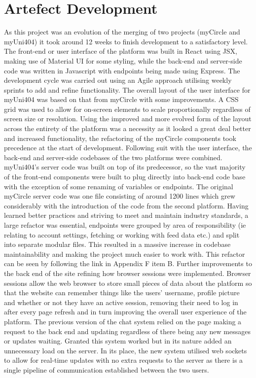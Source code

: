 \documentclass[lettersize,journal]{IEEEtran}
\begin{document}
\section{Artefect Development}
	As this project was an evolution of the merging of two projects (myCircle and myUni404) it took around 12 weeks to finish development to a satisfactory level. The front-end or user interface of
	the platform was built in React using JSX, making use of Material UI for some styling, while the back-end and server-side code was written in Javascript with endpoints being made using
	Express. The development cycle was carried out using an Agile approach utilising weekly sprints to add and refine functionality. The overall layout of the user interface for myUni404 was based 
	on that from myCircle with some	improvements. A CSS grid was used to allow for on-screen elements to scale proportionally regardless of screen size or resolution. Using the improved and more
	evolved form of the layout across the entirety of the platform was a necessity as it looked a great deal better and increased functionality, the refactoring of the myCircle components took
	precedence at the start of development.	Following suit with the user interface, the back-end and server-side codebases of the two platforms were combined. myUni404's server code was built on
	top of its predecessor, so the vast majority of the front-end components were built to plug directly into back-end code base with the exception of some renaming of variables or endpoints. The
	original myCircle server code was one file consisting of around 1200 lines which grew considerably with the introduction of the code from the second platform. Having learned better practices and
	striving to meet and maintain industry standards, a large refactor was essential, endpoints were grouped by area of responsibility (ie relating to account settings, fetching or working with feed
	data etc.) and split into separate modular files. This resulted in a massive increase in codebase maintainability and making the project much easier to work with. This refactor can be seen by following the link in Appendix F item B. Further improvements to the
	back end of the site refining how browser sessions were implemented. Browser sessions allow the web browser to store small pieces of data about the platform so that the website can remember
	things like the users' username, profile picture and whether or not they have an active session, removing their need to log in after every page refresh and in turn improving the overall user
	experience of the platform. The previous version of the chat system relied on the page making a request to the back end and updating regardless	of there being any new messages or updates
	waiting. Granted this system worked but in its nature added an unnecessary load on the server. In its place, the new system utilised web sockets to allow for real-time updates with no extra
	requests to the server as there is a single pipeline of communication established between the two users.
\end{document}
